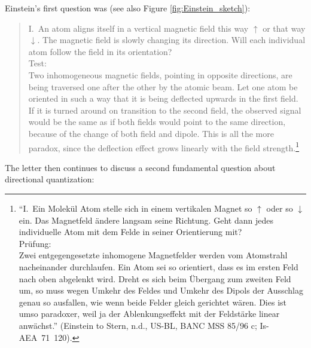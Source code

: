 \documentclass{article}
\begin{document}
Einstein's first question was (see also Figure \ref{fig:Einstein_sketch}):
\begin{quote}
I.~An atom aligns itself in a vertical magnetic field this way $\uparrow$ or that way $\downarrow$. The magnetic field is slowly changing its direction. Will each individual atom follow the field in its orientation?\\
Test:\\
Two inhomogeneous magnetic fields, pointing in opposite directions, are being traversed one after the other by the atomic beam. Let one atom be oriented in such a way that it is being deflected upwards in the first field. If it is turned around on transition to the second field, the observed signal would be the same as if both fields would point to the same direction, because of the change of both field and dipole. This is all the more paradox, since the deflection effect grows linearly with the field strength.\footnote{%
``I.~Ein Molekül Atom stelle sich in einem vertikalen Magnet so $\uparrow$ oder so $\downarrow$ ein. Das Magnetfeld ändere langsam seine Richtung. Geht dann jedes individuelle Atom mit dem Felde in seiner Orientierung mit?\\
Prüfung:\\
Zwei entgegengesetzte inhomogene Magnetfelder werden vom Atomstrahl nacheinander durchlaufen. Ein Atom sei so orientiert, dass es im ersten Feld nach oben abgelenkt wird. Dreht es sich beim Übergang zum zweiten Feld um, so muss wegen Umkehr des Feldes und Umkehr des Dipols der Ausschlag genau so ausfallen, wie wenn beide Felder gleich gerichtet wären. Dies ist umso paradoxer, weil ja der Ablenkungseffekt mit der Feldstärke linear anwächst.''
(Einstein to Stern, n.d., US-BL, BANC MSS 85/96 c; Is-AEA~71~120).}
\end{quote}
The letter then continues to discuss a second fundamental question about directional quantization:
\end{document}
